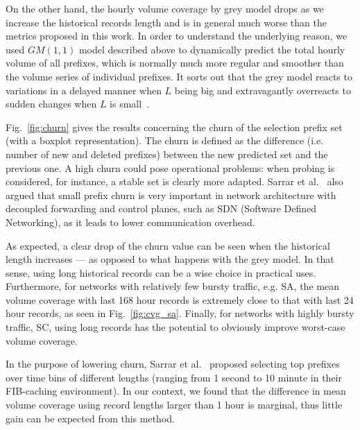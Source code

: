 \documentclass[10pt, conference,letterpaper]{IEEEtran}
\begin{document}
On the other hand, the hourly volume coverage by grey model drops as we increase the historical records length and is in general much worse than the metrics proposed in this work. 
In order to understand the underlying reason, we used $GM(1,1)$ model described above to dynamically predict the total hourly volume of all prefixes, which is normally much more regular and smoother than the volume series of individual prefixes. It sorts out that the grey model reacts to variations in a delayed manner when $L$ being big and extravagantly overreacts to sudden changes when $L$ is small~\cite{RR}. 











Fig.~\ref{fig:churn} gives the results concerning the churn of the selection prefix set (with a boxplot representation).
The churn is defined as the difference (i.e. number of new and deleted prefixes) between the new predicted set and the previous one. A high churn could pose operational problems: when probing is considered, for instance,  a stable set is clearly more adapted. Sarrar et al.\ \cite{Sarrar2012} also argued that small prefix churn is very important in network architecture with decoupled forwarding and control  planes, such as SDN (Software Defined Networking), as it leads to lower communication overhead.


As expected, a clear drop of the churn value can be seen when the historical length increases --- as opposed to what happens with the grey model. 
In that sense, using long historical records can be a wise choice in practical uses.
Furthermore, for networks with relatively few bursty traffic, e.g. SA, the mean volume coverage with last 168 hour records is extremely close to that with last 24 hour records, as seen in Fig.~\ref{fig:cvg_sa}.
Finally, for networks with highly bursty traffic, SC, using long records has the potential to obviously improve worst-case volume coverage. 

In the purpose of lowering churn, Sarrar et al.\ \cite{Sarrar2012} proposed selecting top prefixes over time bins of different lengths (ranging from 1 second to 10 minute in their FIB-caching environment). In our context, we found that the difference in mean volume coverage using record lengths larger than 1 hour is marginal, thus little gain can be expected from this method. 
\end{document}
